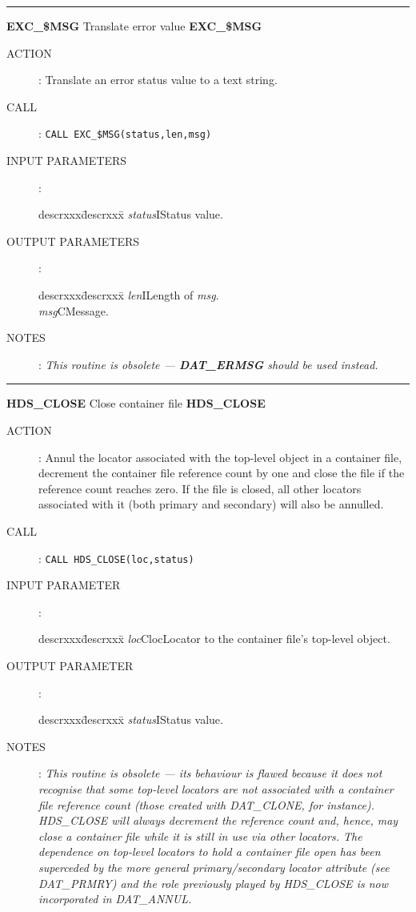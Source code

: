 \rule{\textwidth}{0.3mm}
{\Large {\bf EXC\_\$MSG} \hfill Translate error value \hfill {\bf EXC\_\$MSG}}
\begin{description}
\item [ACTION]:
Translate an error status value to a text string.
\item [CALL]:
{\tt CALL EXC\_\$MSG(status,len,msg)}
\item [INPUT PARAMETERS]:
\begin{tabbing}
descrxxx\=descrxxx\=\kill
{\em status}\>I\>Status value.
\end{tabbing}
\item [OUTPUT PARAMETERS]:
\begin{tabbing}
descrxxx\=descrxxx\=\kill
{\em len}\>I\>Length of {\em msg}.\\
{\em msg}\>C\>Message.
\end{tabbing}
\item [NOTES]:
{\em This routine is obsolete --- {\bf DAT\_ERMSG} should be used instead.}
\end{description}
\goodbreak
\rule{\textwidth}{0.3mm}
{\Large {\bf HDS\_CLOSE} \hfill Close container file \hfill {\bf HDS\_CLOSE}}
\begin{description}
\item [ACTION]:
Annul the locator associated with the top-level object in a container file,
decrement the container file reference count by one and close the file if the
reference count reaches zero. If the file is closed, all other locators
associated with it (both primary and secondary) will also be annulled.
\item [CALL]:
{\tt CALL HDS\_CLOSE(loc,status)}
\item [INPUT PARAMETER]:
\begin{tabbing}
descrxxx\=descrxxx\=\kill
{\em loc}\>Cloc\>Locator to the container file's top-level object.
\end{tabbing}
\item [OUTPUT PARAMETER]:
\begin{tabbing}
descrxxx\=descrxxx\=\kill
{\em status}\>I\>Status value.
\end{tabbing}
\item [NOTES]:
{\em This routine is obsolete --- its behaviour is flawed because it does not
recognise that some top-level locators are not associated with a container file
reference count (those created with DAT\_CLONE, for instance). HDS\_CLOSE will
always decrement the reference count and, hence, may close a container file
while it is still in use via other locators. The dependence on top-level
locators to hold a container file open has been superceded by the more general
primary/secondary locator attribute (see DAT\_PRMRY) and the role previously
played by HDS\_CLOSE is now incorporated in DAT\_ANNUL.}
\end{description}
\goodbreak

